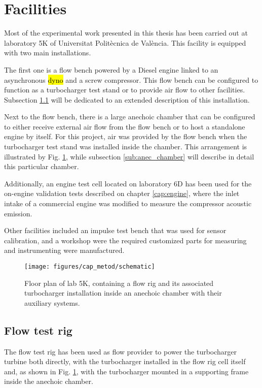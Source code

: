\section{Facilities}

Most of the experimental work presented in this thesis has been carried out at laboratory 5K of Universitat Politècnica de València. This facility is equipped with two main installations.

The first one is a flow bench powered by a Diesel engine linked to an asynchronous \hl{dyno} and a screw compressor. This flow bench can be configured to function as a turbocharger test stand or to provide air flow to other facilities. Subsection \ref{sub:flow_bench} will be dedicated to an extended description of this installation.

Next to the flow bench, there is a large anechoic chamber that can be configured to either receive external air flow from the flow bench or to host a standalone engine by itself. For this project, air was provided by the flow bench when the turbocharger test stand was installed inside the chamber. This arrangement is illustrated by Fig. \ref{fig:floorplan}, while subsection \ref{sub:anec_chamber} will describe in detail this particular chamber.

Additionally, an engine test cell located on laboratory 6D has been used for the on-engine validation tests described on chapter \ref{cap:engine}, where the inlet intake of a commercial engine was modified to measure the compressor acoustic emission.

Other facilities included an impulse test bench that was used for sensor calibration, and a workshop were the required customized parts for measuring and instrumenting were manufactured.

\begin{figure}[t!]
\centering
\texttt{[image: figures/cap\_metod/schematic]}
\caption{Floor plan of lab 5K, containing a flow rig and its associated turbocharger installation inside an anechoic chamber with their auxiliary systems.}
\label{fig:floorplan}
\end{figure}

\subsection{Flow test rig} \label{sub:flow_bench}

The flow test rig has been used as flow provider to power the turbocharger turbine both directly, with the turbocharger installed in the flow rig cell itself and, as shown in Fig. \ref{fig:floorplan}, with the turbocharger mounted in a supporting frame inside the anechoic chamber.

